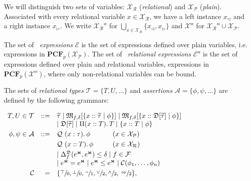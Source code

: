 \documentclass{sig-alternate-05-2015}
\theoremstyle{plain}
\theoremstyle{definition}
\theoremstyle{corollary}
\renewcommand{\implies}{\Rightarrow}
\def\vars{\ensuremath{\mathcal{X}}\xspace}
\def\pcfp{\ensuremath{\mathbf{PCF}_{p}}\xspace}
\newcommand{\coty}[1]{\widetilde{#1}}
\def\lvmark{\triangleleft}
\def\rvmark{\triangleright}
\renewcommand{\l}[1]{#1_\lvmark}
\renewcommand{\r}[1]{#1_\rvmark}
\newcommand{\rmark}[1]{{#1}^{\Join}}
\def\pvars{\ensuremath{\mathcal{X}_{\mathcal{P}}}\xspace}
\def\rvars{\ensuremath{\mathcal{X}_{\mathcal{R}}}\xspace}
\newcommand{\expr}[0]{\ensuremath{\mathcal{E}}}
\newcommand{\rexpr}[0]{\ensuremath{\expr^{\Join}}}
\newcommand{\rtypes}[0]{\ensuremath{\mathcal{T}}\xspace}
\newcommand{\rassert}[0]{\ensuremath{\mathcal{A}}\xspace}
\newcommand{\rtmod}[3]{\mathfrak{M}_{#1,#2}[{#3}]}
\newcommand{\rtprod}[3]{\Pi ({#1} :: {#2}) .\, {#3}}
\newcommand{\rtref}[3]{\{ {#1} :: {#2} \vbar {#3} \}}
\def\rfalse{\bot}
\def\rtrue{\top}
\newcommand{\fquant}[4]{{#1}\ ({#2} : {#3}) .\, {#4}}
\newcommand{\rquant}[4]{{#1}\ ({#2} :: {#3}) .\, {#4}}
\def\quantvar{\mathcal{Q}}
\def\rformc{\mathcal{C}}
\newcommand{\vbar}[0]{\mathrel{|}}
\newcommand{\stdist}[1]{\mathfrak{D}[{#1}]}
\newcommand{\fdiv}{\ensuremath{f}}
\begin{document}
We will distinguish two sets of variables: $\rvars$ (\emph{relational}) and $\pvars$ (\emph{plain}).
Associated with every relational variable $x\in \rvars$, we have a left instance
$\l{x}$ and a right instance $\r{x}$.
We write $\rmark{\rvars}$ for $\bigcup_{x \in \rvars} \{ \l{x}, \r{x} \}$
and $\rmark{\vars}$ for $\rmark{\rvars} \cup \pvars$.

The set of \THESYSTEM~\emph{expressions} $\expr$ is the set of expressions
defined over plain variables, i.e. expressions in $\pcfp(\pvars)$.
The set of \THESYSTEM~\emph{relational expressions} $\rexpr$ is the
set of expressions defined over plain and relational variables,
expressions in $\pcfp(\rmark{\vars})$, where only non-relational 
variables can be bound.



The sets of \emph{relational types} $\rtypes = \{ T, U, \ldots \}$ and
\emph{assertions} $\rassert = \{ \phi, \psi, \ldots \}$ are defined by
the following grammars:
\begin{center}
  $\begin{array}{rrl}
    T, U \in \rtypes
      & ::= & \coty{\tau} \vbar
              \rtmod{\fdiv}{\delta}{\rtref{x}{\coty{\tau}}{\phi}}
\vbar
              \rtmod{\fdiv}{\delta}{\rtref{x}{\stdist{\coty{\tau}}}{\phi}}\\
&&
              \vbar
              \stdist{\coty{\tau}} \vbar
              \rtprod{x}{T}{T} \vbar
              \rtref{x}{T}{\phi}\\[.3em]
    \phi, \psi\in \rassert
      & ::= &
              \begin{array}[t]{@{}l@{\hspace{1cm}}l@{}}
                \fquant{\quantvar}{x}{\tau}{\phi} & (x \in \pvars)\\[.3em]
                \rquant{\quantvar}{x}{T}{\phi} & (x \in \rvars)\\[.3em]
              \end{array}\\
           && \vbar
           \Delta^{\mathfrak{D}}_\fdiv(\rmark{e},\rmark{e})\leq
           \delta\vbar
\fdiv\in\mathcal{F}\\
&& \vbar             \rmark{e} = \rmark{e} \vbar
              \rmark{e} \le \rmark{e}
\vbar \rformc(\phi_1, \ldots, \phi_n)\\[.3em]
    \rformc &= & \{ \sfrac{\rtrue}{0}, \sfrac{\rfalse}{0},
                     \sfrac{\neg}{1}, \sfrac{\vee}{2}, \sfrac{\wedge}{2},
                     \sfrac{\implies}{2} \} , 

  \end{array}$
\end{center}
\end{document}
